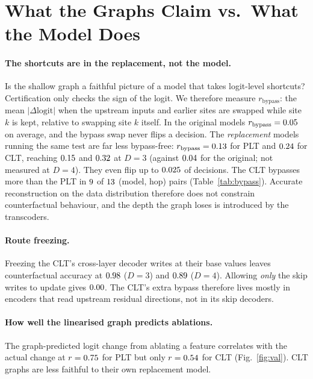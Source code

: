 \section{What the Graphs Claim vs.\ What the Model Does}
\paragraph{The shortcuts are in the replacement, not the model.} Is the shallow graph a faithful picture of a model that takes logit-level shortcuts? Certification only checks the sign of the logit. We therefore measure $r_\mathrm{bypass}$: the mean $|\Delta\mathrm{logit}|$ when the upstream inputs and earlier sites are swapped while site $k$ is kept, relative to swapping site $k$ itself. In the original models $r_\mathrm{bypass}=0.05$ on average, and the bypass swap never flips a decision. The \emph{replacement} models running the same test are far less bypass-free: $r_\mathrm{bypass}=0.13$ for PLT and $0.24$ for CLT, reaching $0.15$ and $0.32$ at $D=3$ (against $0.04$ for the original; not measured at $D=4$). They even flip up to $0.025$ of decisions. The CLT bypasses more than the PLT in $9$ of $13$ (model, hop) pairs (Table~\ref{tab:bypass}). Accurate reconstruction on the data distribution therefore does not constrain counterfactual behaviour, and the depth the graph loses is introduced by the transcoders.
\begin{table}[t]\centering\caption{Logit-level bypass ratio $r_\mathrm{bypass}$ (lower = more faithful to the stepwise circuit).}\label{tab:bypass}\end{table}
\paragraph{Route freezing.} Freezing the CLT's cross-layer decoder writes at their base values leaves counterfactual accuracy at $0.98$ ($D=3$) and $0.89$ ($D=4$). Allowing \emph{only} the skip writes to update gives $0.00$. The CLT's extra bypass therefore lives mostly in encoders that read upstream residual directions, not in its skip decoders.
\paragraph{How well the linearised graph predicts ablations.} The graph-predicted logit change from ablating a feature correlates with the actual change at $r=0.75$ for PLT but only $r=0.54$ for CLT (Fig.~\ref{fig:val}). CLT graphs are less faithful to their own replacement model.

